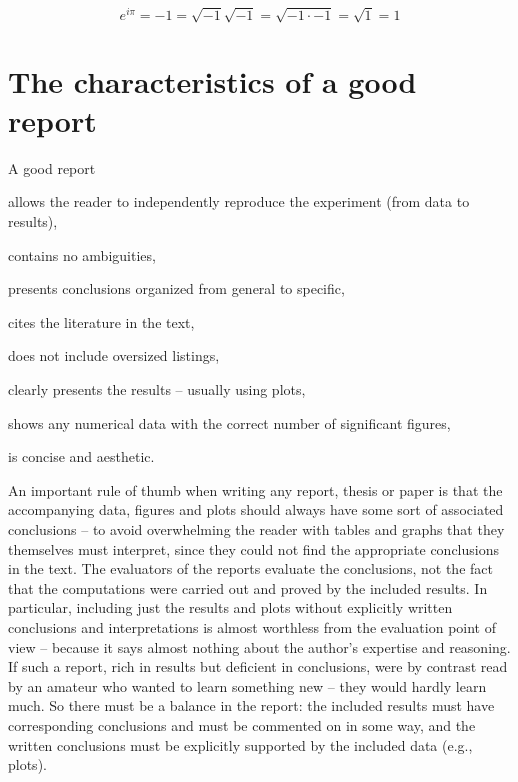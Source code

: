 \documentclass{article}
\begin{document}
\begin{equation}
\label{eq:mysterious-equation}
e^{i \pi} = -1 = \sqrt {-1} \sqrt {-1} = \sqrt {-1 \cdot -1} = \sqrt 1 = 1
\end{equation}





\section{The characteristics of a good report}

A good report
\begin{tightlist}
\item allows the reader to independently reproduce the experiment (from data to results),
\item contains no ambiguities,
\item presents conclusions organized from general to specific,
\item cites the literature in the text,
\item does not include oversized listings,
\item clearly presents the results -- usually using plots,
\item shows any numerical data with the correct number of significant figures,
\item is concise and aesthetic.
\end{tightlist}

\noindent An important rule of thumb when writing any report, thesis or paper is that the accompanying data, figures and plots should always have some sort of associated conclusions -- to avoid overwhelming the reader with tables and graphs that they themselves must interpret, since they could not find the appropriate conclusions in the text. The evaluators of the reports evaluate the conclusions, not the fact that the computations were carried out and proved by the included results. In particular, including just the results and plots without explicitly written conclusions and interpretations is almost worthless from the evaluation point of view -- because it says almost nothing about the author's expertise and reasoning. If such a report, rich in results but deficient in conclusions, were by contrast read by an amateur who wanted to learn something new -- they would hardly learn much. So there must be a balance in the report: the included results must have corresponding conclusions and must be commented on in some way, and the written conclusions must be explicitly supported by the included data (e.g., plots).
\end{document}
